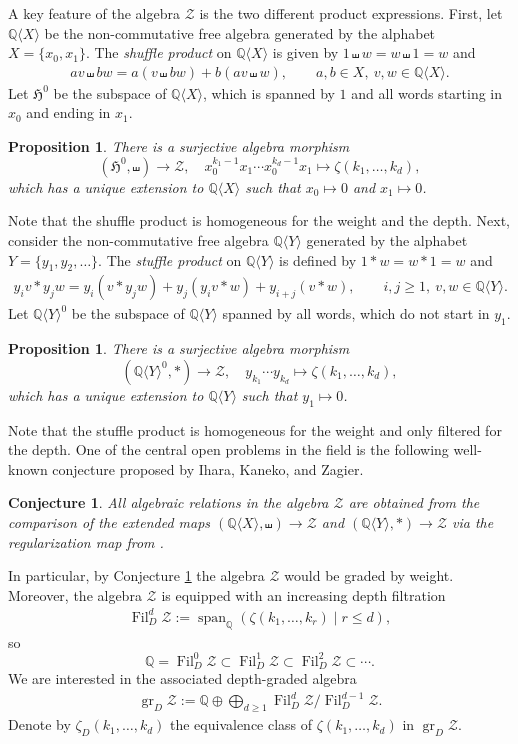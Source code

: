 \documentclass[11pt, a4paper]{amsart}
\newtheorem{prop}[thm]{Proposition}
\newtheorem{conj}[thm]{Conjecture}
\numberwithin{equation}{section}
\theoremstyle{definition}
\newcommand{\Q}{\mathbb{Q}}
\newcommand{\MZV}{\mathcal{Z}}
\newcommand{\grMZV}{\operatorname{gr}_D\MZV}
\newcommand{\QX}{\Q\langle X\rangle}
\newcommand{\QY}{\Q\langle Y\rangle}
\begin{document}
A key feature of the algebra $\MZV$ is the two different product expressions. First, let $\QX$ be the non-commutative free algebra generated by the alphabet $X=\{x_0,x_1\}$. The \emph{shuffle product} on $\QX$ is given by $1\shuffle w=w\shuffle 1 =w$ and
\begin{align*}
av\shuffle bw=a(v\shuffle bw)+b(av\shuffle w),\qquad a,b\in X,\ v,w\in \QX.
\end{align*}
Let $\mathfrak{H}^0$ be the subspace of $\QX$, which is spanned by $1$ and all words starting in $x_0$ and ending in $x_1$.
\begin{prop} \label{prop:shuffle}
There is a surjective algebra morphism
\[
(\mathfrak{H}^0,\shuffle)\to\MZV,\quad x_0^{k_1-1}x_1\cdots x_0^{k_d-1}x_1\mapsto \zeta(k_1,\ldots,k_d),
\]
which has a unique extension to $\QX$ such that $x_0\mapsto 0$ and $x_1\mapsto 0$.
\end{prop}
Note that the shuffle product is homogeneous for the weight and the depth.
Next, consider the non-commutative free algebra $\QY$ generated by the alphabet $Y=\{y_1,y_2,\ldots\}$. The \emph{stuffle product} on $\QY$ is defined by $1\ast w=w\ast 1 =w$ and
\begin{align*}
y_iv\ast y_jw=y_i(v\ast y_jw)+y_j(y_iv\ast w)+y_{i+j}(v\ast w),\qquad i,j\geq1,\ v,w\in \QY.
\end{align*}
Let $\QY^0$ be the subspace of $\QY$ spanned by all words, which do not start in $y_1$.
\begin{prop} \label{prop:stuffle}
There is a surjective algebra morphism
\[
(\QY^0,\ast)\to\MZV,\quad y_{k_1}\cdots y_{k_d}\mapsto\zeta(k_1,\ldots,k_d),
\]
which has a unique extension to $\QY$ such that $y_1\mapsto0$.
\end{prop}
Note that the stuffle product is homogeneous for the weight and only filtered for the depth.
One of the central open problems in the field is the following well-known conjecture proposed by Ihara, Kaneko, and Zagier. 

\begin{conj} \label{con:IKZ}
All algebraic relations in the algebra $\MZV$ are obtained from the comparison of the extended maps $(\QX,\shuffle)\to \MZV$ and $(\QY,\ast)\to \MZV$ via the regularization map from \cite[Theorem 1]{IKZ}. 
\end{conj}

In particular, by Conjecture \ref{con:IKZ} the algebra $\MZV$ would be graded by weight. Moreover, the algebra $\MZV$ is equipped with an increasing depth filtration
\begin{align*}
\operatorname{Fil}_D^d\MZV := 
\operatorname{span}_\Q(\zeta(k_1,\ldots,k_r)\mid r\leq d),
\end{align*}
so
\[
\Q=\operatorname{Fil}_D^0\MZV\subset \operatorname{Fil}_D^1\MZV\subset \operatorname{Fil}_D^2\MZV\subset\cdots.
\]
We are interested in the associated depth-graded algebra
\begin{align*}
\grMZV := \Q\oplus\bigoplus_{d\geq1} \operatorname{Fil}_D^d\MZV / \operatorname{Fil}_D^{d-1}\MZV.
\end{align*}
Denote by $\zeta_D(k_1,\ldots,k_d)$ the equivalence class of $\zeta(k_1,\ldots,k_d)$ in $\grMZV$.
\end{document}
